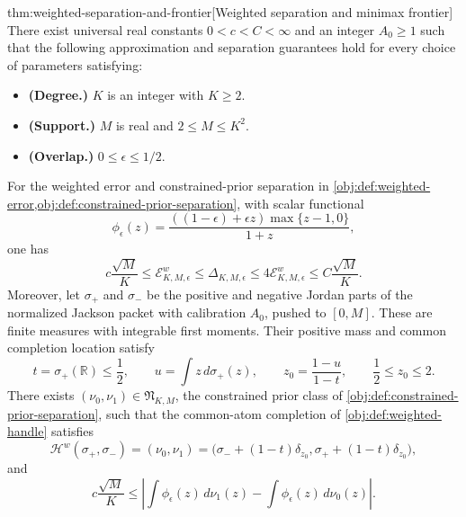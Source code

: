 \documentclass[11pt]{article}
\begin{document}
\begin{theoremv}{thm:weighted-separation-and-frontier}[Weighted separation and minimax frontier]
There exist universal real constants \(0<c<C<\infty\) and an integer \(A_0\geq1\) such that the following approximation and separation guarantees hold for every choice of parameters satisfying:
\begin{itemize}
\item \textbf{(Degree.)} \(K\) is an integer with \(K\geq2\).
\item \textbf{(Support.)} \(M\) is real and \(2\leq M\leq K^2\).
\item \textbf{(Overlap.)} \(0\leq\epsilon\leq1/2\).
\end{itemize}
For the weighted error and constrained-prior separation in
\cref{obj:def:weighted-error,obj:def:constrained-prior-separation}, with scalar functional
\[
\phi_\epsilon(z)=
\frac{((1-\epsilon)+\epsilon z)\max\{z-1,0\}}{1+z},
\]
one has
\[
c\frac{\sqrt M}{K}
\leq \mathcal E_{K,M,\epsilon}^{w}
\leq \Delta_{K,M,\epsilon}
\leq 4\mathcal E_{K,M,\epsilon}^{w}
\leq C\frac{\sqrt M}{K}.
\]
Moreover, let \(\sigma_+\) and \(\sigma_-\) be the positive and negative Jordan parts of the normalized Jackson packet with calibration \(A_0\), pushed to \([0,M]\). These are finite measures with integrable first moments. Their positive mass and common completion location satisfy
\[
t=\sigma_+(\mathbb R)\leq\frac12,
\qquad
u=\int z\,d\sigma_+(z),
\qquad
z_0=\frac{1-u}{1-t},
\qquad
\frac12\leq z_0\leq2.
\]
There exists \((\nu_0,\nu_1)\in\mathfrak N_{K,M}\), the constrained prior class of \cref{obj:def:constrained-prior-separation}, such that the common-atom completion of \cref{obj:def:weighted-handle} satisfies
\[
\mathscr H^w(\sigma_+,\sigma_-)
=(\nu_0,\nu_1)
=\bigl(\sigma_-+(1-t)\delta_{z_0},
       \sigma_++(1-t)\delta_{z_0}\bigr),
\]
and
\[
c\frac{\sqrt M}{K}
\leq
\left|
\int\phi_\epsilon(z)\,d\nu_1(z)
-
\int\phi_\epsilon(z)\,d\nu_0(z)
\right|.
\]


\end{theoremv}
\end{document}
